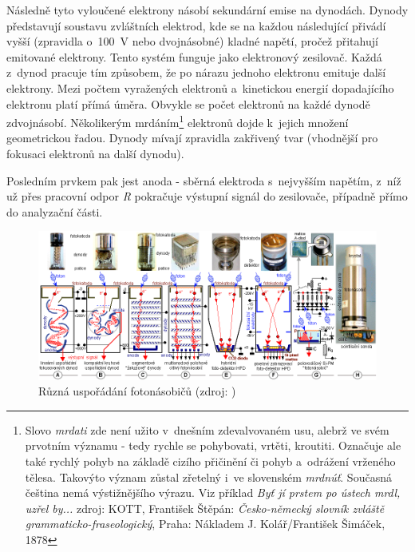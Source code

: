 Následně tyto vyloučené elektrony násobí sekundární emise na dynodách. Dy\-nody představují soustavu
zvláštních elektrod, kde se na každou následující přivádí vyšší (zpravidla o~100~V nebo
dvojnásobné) kladné napětí, pročež přitahují emitované elektrony. Tento systém funguje
jako elektronový zesilovač. Každá z~dynod pracuje tím způsobem, že po nárazu jednoho elektronu emituje
další elektrony. Mezi počtem vyražených elektronů a~kinetickou energií dopadajícího elektronu
platí přímá úměra. Obvykle se počet elektronů na každé dynodě zdvojnásobí. Několikerým
mrdáním\footnote{Slovo \textit{mrdati} zde není užito v~dnešním zdevalvovaném usu, alebrž ve svém prvotním
významu - tedy rychle se pohybovati, vrtěti, kroutiti. Označuje ale také rychlý pohyb na základě cizího
přičinění či pohyb a~odrážení vrženého tělesa. Takovýto význam zůstal zřetelný i~ve slovenském
\textit{mrdnúť}. Současná čeština nemá výstižnějšího výrazu. Viz příklad \textit{Byť jí prstem
po ústech mrdl, uzřel by...} \newline zdroj: KOTT, František Štěpán: \textit{Česko-německý slovník zvláště
grammaticko-fraseologický}, Praha: Nákladem J. Kolář/František Šimáček, 1878} elektronů dojde k~jejich
množení geometrickou řadou. Dynody mívají zpravidla
zakřivený tvar (vhodnější pro fokusaci elektronů na další dynodu). 

Posledním prvkem pak jest anoda - sběrná elektroda s~nejvyšším napětím, z~níž už přes pracovní
odpor \textit{R} pokračuje výstupní signál do zesilovače, případně přímo do analyzační části. 

  \begin{figure}[H]
   \centering
	\includegraphics[scale=0.5]{./pictures/fotonasobice.png}
	\caption[Různá uspořádání fotonásobičů]{Různá uspořádání fotonásobičů
	(zdroj: \cite{spektrometrie})}
      \label{fig:fotonasobice}
  \end{figure}

